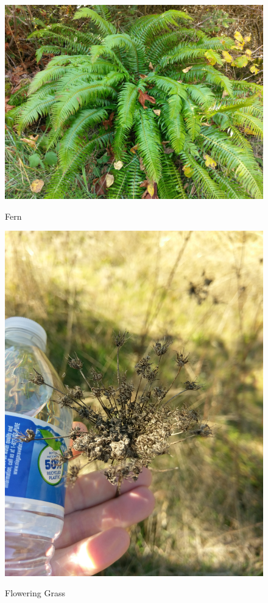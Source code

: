 \documentclass{article}
\begin{document}
\begin{figure}[H]
\centering{}
\caption{Fern}
\includegraphics[scale=0.06]{fern.jpg}
\label{}
\end{figure}

\begin{figure}[H]
\centering{}
\caption{Flowering Grass}
\includegraphics[scale=0.06]{grass_inflourecense_closeup.jpg}
\label{}
\end{figure}
\end{document}

